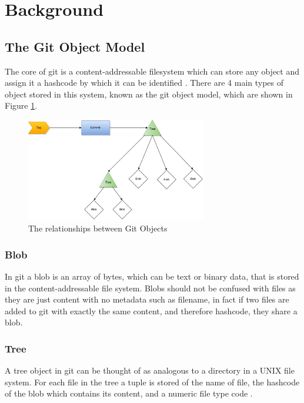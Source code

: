 \documentclass[runningheads,a4paper]{llncs}
\begin{document}
\section{Background}
\subsection{The Git Object Model}
The core of git is a content-addressable filesystem which can store any object and assign it a hashcode by which it can be identified \cite{progit}. There are 4 main types of object stored in this system, known as the git object model, which are shown in Figure \ref{fig:gitobjectmodeldiagram}.

\begin{figure}[h]
	\centering
	\includegraphics[width=0.7\textwidth]{../thesis/images/gitobjectmodel}
	\caption{The relationships between Git Objects}
	\label{fig:gitobjectmodeldiagram}
\end{figure} 

\subsubsection{Blob}
In git a blob is an array of bytes, which can be text or binary data, that is stored in the content-addressable file system. Blobs should not be confused with files as they are just content with no metadata such as filename, in fact if two files are added to git with exactly the same content, and therefore hashcode, they share a blob.

\subsubsection{Tree}
A tree object in git can be thought of as analogous to a directory in a UNIX file system. For each file in the tree a tuple is stored of the name of file, the hashcode of the blob which contains its content, and a numeric file type code \cite{gitmagic}.
\end{document}
